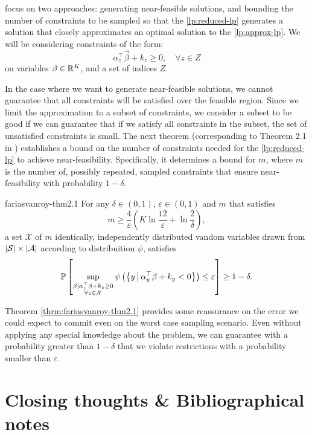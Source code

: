 \citeauthor{farias2004constraint} focus on two approaches: generating
near-feasible solutions, and bounding the number of constraints to be sampled so
that the \eqref{lp:reduced-lp} generates a solution that closely approximates an optimal solution
to the \eqref{lp:approx-lp}. We will be considering constraints of the form:
\[
    \alpha_{z}^{\top} \vec{\beta} + k_z \geq 0, \quad \forall z \in Z
\]
on variables $\mathbf{\beta} \in \mathbb{R}^{K}$, and a set of indices $Z$.

In the case where we want to generate near-feasible solutions, we cannot
guarantee that all constraints will be satisfied over the feasible region. Since
we limit the approximation to a subset of constraints, we consider a subset to
be good if we can guarantee that if we satisfy all constraints in the subset,
the set of unsatisfied constraints is small. The next theorem (corresponding to
Theorem 2.1 in \cite[pg.~467]{farias2004constraint}) establishes a bound on the
number of constraints needed for the \eqref{lp:reduced-lp} to achieve
near-feasibility. Specifically, it determines a bound for $m$, where $m$ is the
number of, possibly repeated, sampled constraints that ensure near-feasibility
with probability $1 - \delta$.

\begin{thrm}{}{fariasvanroy-thm2.1}
    For any $\delta \in (0,1)$, $\varepsilon \in (0,1)$ and $m$ that satisfies
    \[
        m \geq \frac{4}{\varepsilon} \left( K \ln \frac{12}{\varepsilon} + \ln \frac{2}{\delta} \right),
    \]
    a set $\mathcal{X}$ of $m$ identically, independently distributed vandom
    variables drawn from $|\mathcal{S}| \times |\mathcal{A}|$ according to
    distribuition $\psi$, satisfies 
    \[
        \mathbb{P}\left[
            \sup_{\substack{\mathbf{\beta} \mid \alpha_{z}^{\top} \mathbf{\beta} + k_{z} \geq 0  \\ \forall z \in \mathcal{X} }}
            \psi \left( \left\{ y \,\middle\vert\, \alpha_{y}^{\top} \mathbf{\beta} + k_y  < 0 \right\} \right) \leq \varepsilon
        \right] \geq 1 - \delta.
    \]
\end{thrm}

Theorem \ref{thrm:fariasvanroy-thm2.1} provides some reassurance on the error we
could expect to commit even on the worst case sampling scenario. Even without
applying any special knowledge about the problem, we can guarantee with a
probability greater than $1 - \delta$ that we violate restrictions with a
probability smaller than $\varepsilon$.

\section{Closing thoughts \& Bibliographical notes}

